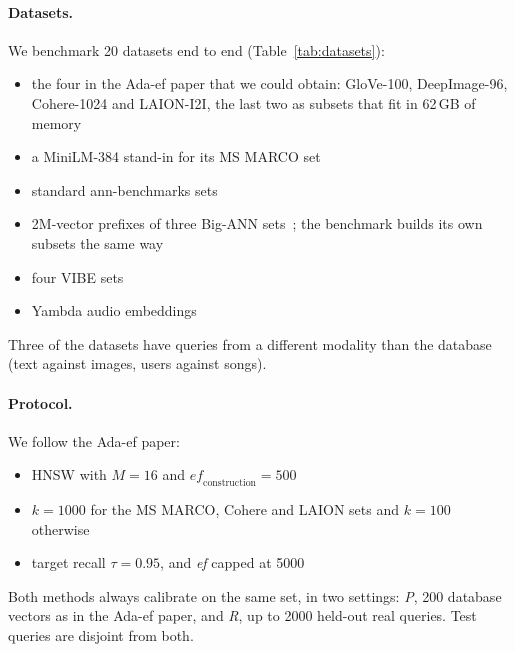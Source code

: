\documentclass[sigconf,review=false,screen]{acmart}
\newcommand{\ef}{\textit{ef}}
\begin{document}
\paragraph{Datasets.}
We benchmark 20 datasets end to end (Table~\ref{tab:datasets}):
\begin{itemize}
\item the four in the Ada-ef paper that we could obtain: GloVe-100, DeepImage-96, Cohere-1024 and
  LAION-I2I, the last two as subsets that fit in 62\,GB of memory
\item a MiniLM-384 stand-in for its MS MARCO set
\item standard ann-benchmarks sets~\cite{aumuller2020annbenchmarks}
\item 2M-vector prefixes of three Big-ANN sets~\cite{simhadri2022bigann}; the benchmark builds its own
  subsets the same way
\item four VIBE sets~\cite{jaasaari2025vibe}
\item Yambda audio embeddings~\cite{ploshkin2025yambda}
\end{itemize}
Three of the datasets have queries from a different modality than the database (text against images,
users against songs).

\paragraph{Protocol.}
We follow the Ada-ef paper:
\begin{itemize}
\item HNSW with $M = 16$ and $\mathit{ef}_{\mathrm{construction}} = 500$
\item $k = 1000$ for the MS MARCO, Cohere and LAION sets and $k = 100$ otherwise
\item target recall $\tau = 0.95$, and \ef{} capped at 5000
\end{itemize}
Both methods always calibrate on the same set, in two settings: \emph{P}, 200 database vectors as in
the Ada-ef paper, and \emph{R}, up to 2000 held-out real queries. Test queries are disjoint from
both.
\end{document}
